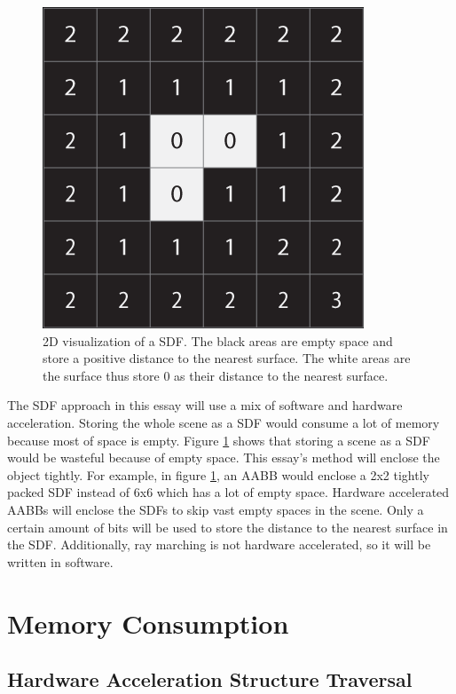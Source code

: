 \documentclass[12pt]{article}
\begin{document}
\begin{figure}[h]
    \begin{center}
        \includegraphics[scale=0.22]{Voxel-SDF}
    \end{center}
    \caption{
        2D visualization of a SDF. The black areas are empty space and store a positive distance to the nearest surface.
        The white areas are the surface thus store 0 as their distance to the nearest surface.
        \parencite{ByteWrangler:Voxel-SDF}}
    \label{fig:Voxel-SDF}
\end{figure}

The SDF approach in this essay will use a mix of software and hardware acceleration.
Storing the whole scene as a SDF would consume a lot of memory because most of space is empty.
Figure \ref{fig:Voxel-SDF} shows that storing a scene as a SDF would be wasteful because of empty space.
This essay's method will enclose the object tightly. For example, in figure \ref{fig:Voxel-SDF}, an AABB would enclose a 2x2 tightly packed SDF instead of 6x6 which has a lot of empty space.
Hardware accelerated AABBs will enclose the SDFs to skip vast empty spaces in the scene.
Only a certain amount of bits will be used to store the distance to the nearest surface in the SDF.
Additionally, ray marching is not hardware accelerated, so it will be written in software.

\section{Memory Consumption}

\subsection{Hardware Acceleration Structure Traversal}
\end{document}
